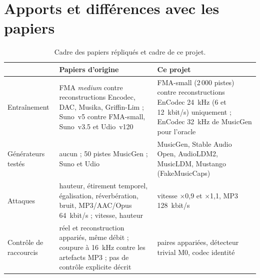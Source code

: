 \documentclass[a4paper, 11pt]{article}
\begin{document}
\section{Apports et différences avec les papiers}
\label{sec:apports}

\begin{table}[h]
    \centering
    \small
    \begin{tabularx}{\textwidth}{lYY}
        \toprule
        & Papiers d'origine & Ce projet \\
        \midrule
        Entraînement & FMA \emph{medium} contre reconstructions Encodec, DAC, Musika, Griffin-Lim
        \cite{afchar2024easy} ; Suno~v5 contre FMA-small, Suno~v3.5 et Udio~v120 \cite{dugelay2026robustness} &
        FMA-small (2\,000 pistes) contre reconstructions EnCodec 24~kHz (6 et 12~kbit/s) uniquement ; EnCodec
        32~kHz de MusicGen pour l'oracle \\
        Générateurs testés & aucun \cite{afchar2024easy} ; 50 pistes MusicGen \cite{afchar2025challenges} ;
        Suno et Udio \cite{afchar2025fourier, dugelay2026robustness} & MusicGen, Stable Audio Open, AudioLDM2,
        MusicLDM, Mustango (FakeMusicCaps) \\
        Attaques & hauteur, étirement temporel, égalisation, réverbération, bruit, MP3/AAC/Opus 64~kbit/s
        \cite{afchar2024easy} ; vitesse, hauteur \cite{dugelay2026robustness} & vitesse $\times$0,9 et
        $\times$1,1, MP3 128~kbit/s \\
        Contrôle de raccourcis & réel et reconstruction appariés, même débit \cite{afchar2024easy} ; coupure
        à 16~kHz contre les artefacts MP3 \cite{afchar2025challenges} ; pas de contrôle explicite décrit
        \cite{dugelay2026robustness} & paires appariées, détecteur trivial M0, codec identité \\
        \bottomrule
    \end{tabularx}
    \caption{Cadre des papiers répliqués et cadre de ce projet.}
    \label{tab:cadres}
\end{table}
\end{document}
